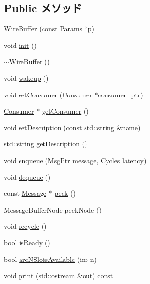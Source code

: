 \subsection*{Public メソッド}
\begin{DoxyCompactItemize}
\item 
\hyperlink{classWireBuffer_ae9a9cdc14adf2ac6984bab0b253d2cec}{WireBuffer} (const \hyperlink{classWireBuffer_a7ad77180949dea9bc226a0f7571391a0}{Params} $\ast$p)
\item 
void \hyperlink{classWireBuffer_a02fd73d861ef2e4aabb38c0c9ff82947}{init} ()
\item 
\hyperlink{classWireBuffer_ab5bf2bdbeae187001e2184d5fdf106c8}{$\sim$WireBuffer} ()
\item 
void \hyperlink{classWireBuffer_ae674290a26ecbd622c5160e38e8a4fe9}{wakeup} ()
\item 
void \hyperlink{classWireBuffer_a8487c37680239f103e21ada9acf1726d}{setConsumer} (\hyperlink{classConsumer}{Consumer} $\ast$consumer\_\-ptr)
\item 
\hyperlink{classConsumer}{Consumer} $\ast$ \hyperlink{classWireBuffer_a2417fc7252a612b5c976ceaa2d1be4f7}{getConsumer} ()
\item 
void \hyperlink{classWireBuffer_a9cdbe64eebafb111a124edec55ed2340}{setDescription} (const std::string \&name)
\item 
std::string \hyperlink{classWireBuffer_a73da75c3e5ec30855a02eae2ba824e38}{getDescription} ()
\item 
void \hyperlink{classWireBuffer_aef2cd392bb1d0b136dc1d901d6e59f13}{enqueue} (\hyperlink{classRefCountingPtr}{MsgPtr} message, \hyperlink{classCycles}{Cycles} latency)
\item 
void \hyperlink{classWireBuffer_a851b6644e3e336c07f8e6fe77234b97f}{dequeue} ()
\item 
const \hyperlink{classMessage}{Message} $\ast$ \hyperlink{classWireBuffer_ab635dc32ebecf260c15d8fbbbb9b21e0}{peek} ()
\item 
\hyperlink{classMessageBufferNode}{MessageBufferNode} \hyperlink{classWireBuffer_a719ec7b793f4cb9336241e7c9a405323}{peekNode} ()
\item 
void \hyperlink{classWireBuffer_a98102238652df03cf871c9766de96af2}{recycle} ()
\item 
bool \hyperlink{classWireBuffer_acbed040576a7a18e2d9c46b2f15e0162}{isReady} ()
\item 
bool \hyperlink{classWireBuffer_a99a0d76f7266570912e6b0901cfaf9cf}{areNSlotsAvailable} (int n)
\item 
void \hyperlink{classWireBuffer_ac55fe386a101fbae38c716067c9966a0}{print} (std::ostream \&out) const 
\end{DoxyCompactItemize}
